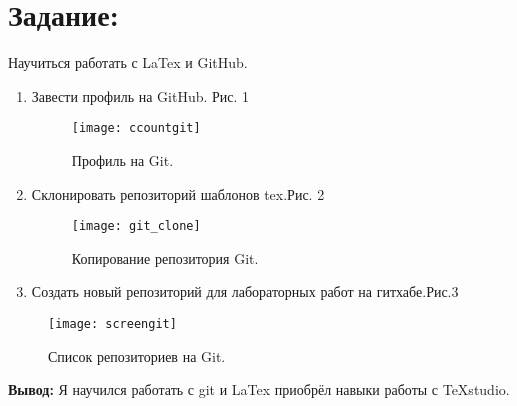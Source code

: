 \section*{Задание:}
Научиться работать с LaTex и GitHub.
\begin{enumerate}

    \item{Завести профиль на GitHub. Рис. 1}

\begin{figure}[h]%
\centering
\texttt{[image: ccountgit]}%
\caption{Профиль на Git.}
\label{fig:ccountgit}
\end{figure}

\item{Склонировать репозиторий шаблонов tex.Рис. 2}



\begin{figure}[h]
    \centering
    \texttt{[image: git\_clone]}
    \caption{Копирование репозитория Git.}
    \label{fig:git_clone}
\end{figure}


\item{Создать новый репозиторий для лабораторных работ на гитхабе.Рис.3}
\end{enumerate}

\newpage


\renewcommand{\theenumi}{\arabic{enumi})}
\begin{figure}[h]
\centering
\texttt{[image: screengit]}
\caption{Список репозиториев на Git.}
\label{fig:screengit}
\end{figure}




\long\def\comment{%
}

\textbf{Вывод:} Я научился работать с git и LaTex приобрёл навыки работы с TeXstudio.
